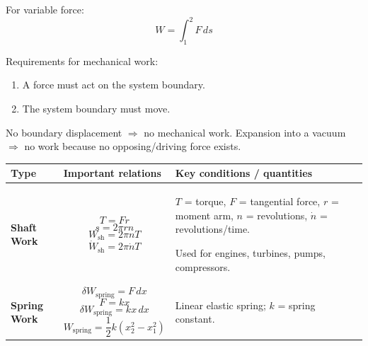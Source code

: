 \documentclass[12pt]{article}
\begin{document}
For variable force:
\begin{equation*}
W=\int_1^2F\,ds
\end{equation*}

Requirements for mechanical work:
\begin{enumerate}
    \item A force must act on the system boundary.
    \item The system boundary must move.
\end{enumerate}

No boundary displacement $\Rightarrow$ no mechanical work.
Expansion into a vacuum $\Rightarrow$ no work because no opposing/driving force exists.

\begin{center}
\renewcommand{\arraystretch}{1.5}
\begin{tabular}{|p{3.0cm}|p{6.0cm}|p{7.0cm}|}
\hline
\textbf{Type} & \textbf{Important relations} & \textbf{Key conditions / quantities} \\
\hline

\textbf{Shaft Work}
&
\begin{equation*}
T=Fr
\end{equation*}
\begin{equation*}
s=2\pi rn
\end{equation*}
\begin{equation*}
W_{\mathrm{sh}}=2\pi nT
\end{equation*}
\begin{equation*}
\dot{W}_{\mathrm{sh}}=2\pi\dot{n}T
\end{equation*}
&
$T$ = torque,\;
$F$ = tangential force,\;
$r$ = moment arm,\;
$n$ = revolutions,\;
$\dot n$ = revolutions/time.

Used for engines, turbines, pumps, compressors.
\\
\hline

\textbf{Spring Work}
&
\begin{equation*}
\delta W_{\mathrm{spring}}=F\,dx
\end{equation*}
\begin{equation*}
F=kx
\end{equation*}
\begin{equation*}
\delta W_{\mathrm{spring}}=kx\,dx
\end{equation*}
\begin{equation*}
W_{\mathrm{spring}}
=
\frac12k(x_2^2-x_1^2)
\end{equation*}
&
Linear elastic spring; $k$ = spring constant.


\end{tabular}
\end{center}
\end{document}
